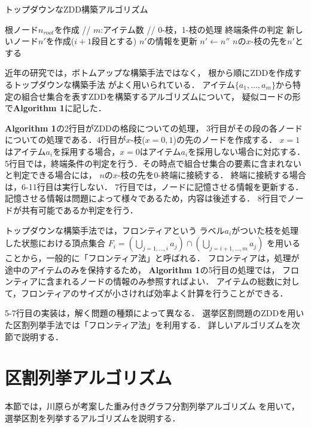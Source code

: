 \begin{algorithm}
  \caption{トップダウンなZDD構築アルゴリズム}
  \label{zdd_topdown}
  \begin{algorithmic}[1]
    \State 根ノード$n_{root}$を作成
     // $m$:アイテム数
       // 0-枝，1-枝の処理
        \State 終端条件の判定
        \State 新しいノード$n'$を作成($i+1$段目とする)
        \State $n'$の情報を更新
          \State $n' \gets n''$
        \EndIf
        \State $n$の$x$-枝の先を$n'$とする
        \EndFor
      \EndFor
    \EndFor
  \end{algorithmic}
\end{algorithm}

近年の研究では，ボトムアップな構築手法ではなく，
根から順にZDDを作成するトップダウンな構築手法\cite{minato_or}\cite{sekine}
がよく用いられている．
アイテム$\{a_1,\ldots	,a_m\}$から特定の組合せ集合を表すZDDを構築するアルゴリズムについて，
疑似コードの形で\textbf{Algorithm 1}に記した．

\textbf{Algorithm 1}の2行目がZDDの格段についての処理，
3行目がその段の各ノードについての処理である．4行目が$x$-枝($x=0,1$)の先のノードを作成する．
$x=1$はアイテム$a_i$を採用する場合，$x=0$はアイテム$a_i$を採用しない場合に対応する．
5行目では，終端条件の判定を行う．その時点で組合せ集合の要素に含まれないと判定できる場合には，
$n$の$x$-枝の先を0-終端に接続する．
終端に接続する場合は，6-11行目は実行しない．
7行目では，ノードに記憶させる情報を更新する．
記憶させる情報は問題によって様々であるため，内容は後述する．
8行目でノードが共有可能であるか判定を行う．

トップダウンな構築手法では，フロンティアという
ラベル$a_i$がついた枝を処理した状態における頂点集合
$F_i=(\bigcup_{j=1,\ldots ,i}a_j)\cap (\bigcup_{j=i+1, \ldots, m} a_j)$
を用いることから，一般的に「フロンティア法」と呼ばれる．
フロンティアは，処理が途中のアイテムのみを保持するため，
\textbf{Algorithm 1}の5行目の処理では，
フロンティアに含まれるノードの情報のみ参照すればよい．
アイテムの総数に対して，フロンティアのサイズが小さければ効率よく計算を行うことができる．

5-7行目の実装は，解く問題の種類によって異なる．
選挙区割問題のZDDを用いた区割列挙手法では「フロンティア法」を利用する．
詳しいアルゴリズムを次節で説明する．

\section{区割列挙アルゴリズム}
本節では，川原らが考案した重み付きグラフ分割列挙アルゴリズム\cite{kawahara}
を用いて，選挙区割を列挙するアルゴリズムを説明する．

